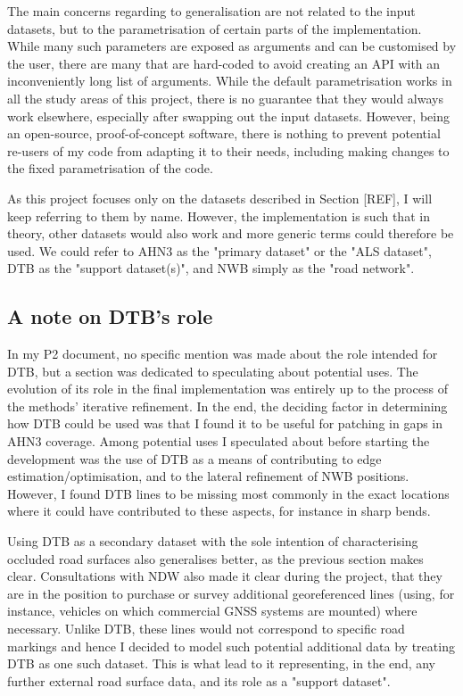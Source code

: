 The main concerns regarding to generalisation are not related to the input datasets, but to the parametrisation of certain parts of the implementation. While many such parameters are exposed as arguments and can be customised by the user, there are many that are hard-coded to avoid creating an API with an inconveniently long list of arguments. While the default parametrisation works in all the study areas of this project, there is no guarantee that they would always work elsewhere, especially after swapping out the input datasets. However, being an open-source, proof-of-concept software, there is nothing to prevent potential re-users of my code from adapting it to their needs, including making changes to the fixed parametrisation of the code.

As this project focuses only on the datasets described in Section [REF], I will keep referring to them by name. However, the implementation is such that in theory, other datasets would also work and more generic terms could therefore be used. We could refer to AHN3 as the "primary dataset" or the "ALS dataset", DTB as the "support dataset(s)", and NWB simply as the "road network".

\subsection{A note on DTB's role}
\label{sub:generalisation}

In my P2 document, no specific mention was made about the role intended for DTB, but a section was dedicated to speculating about potential uses. The evolution of its role in the final implementation was entirely up to the process of the methods' iterative refinement. In the end, the deciding factor in determining how DTB could be used was that I found it to be useful for patching in gaps in AHN3 coverage. Among potential uses I speculated about before starting the development was the use of DTB as a means of contributing to edge estimation/optimisation, and to the lateral refinement of NWB positions. However, I found DTB lines to be missing most commonly in the exact locations where it could have contributed to these aspects, for instance in sharp bends.

Using DTB as a secondary dataset with the sole intention of characterising occluded road surfaces also generalises better, as the previous section makes clear. Consultations with NDW also made it clear during the project, that they are in the position to purchase or survey additional georeferenced lines (using, for instance, vehicles on which commercial GNSS systems are mounted) where necessary. Unlike DTB, these lines would not correspond to specific road markings and hence I decided to model such potential additional data by treating DTB as one such dataset. This is what lead to it representing, in the end, any further external road surface data, and its role as a "support dataset".

